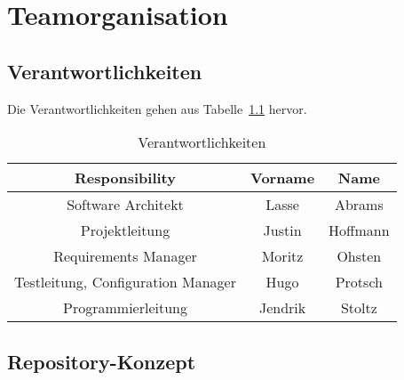 \chapter{Teamorganisation}\label{ch:teamorganisation}



\section{Verantwortlichkeiten}\label{sec:verantwortlichkeiten}

Die Verantwortlichkeiten gehen aus Tabelle~\ref{tab:verantwortlichkeiten} hervor.

\begin{table}[h]
    \begin{center}
        \begin{tabular}{ |c|c|c| }
            \hline
            Responsibility                     & Vorname & Name     \\
            \hline\hline
            Software Architekt                 & Lasse   & Abrams   \\
            \hline
            Projektleitung                     & Justin  & Hoffmann \\
            \hline
            Requirements Manager               & Moritz  & Ohsten   \\
            \hline
            Testleitung, Configuration Manager & Hugo    & Protsch  \\
            \hline
            Programmierleitung                 & Jendrik & Stoltz   \\
            \hline
        \end{tabular}
    \end{center}
    \caption{Verantwortlichkeiten}
    \label{tab:verantwortlichkeiten}
\end{table}


\section{Repository-Konzept}\label{sec:repository-konzept}

